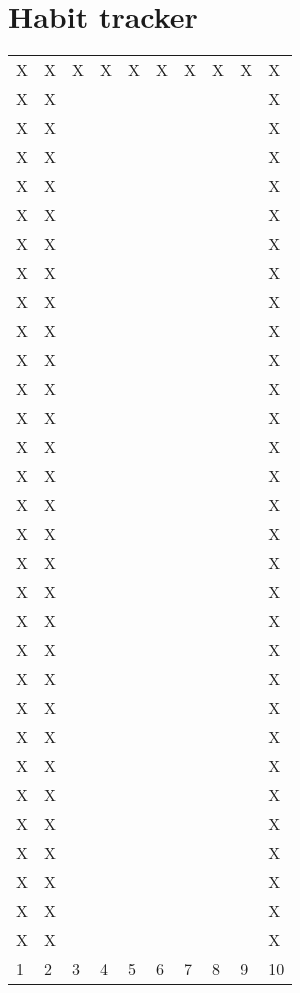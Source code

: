 \documentclass[a4paper]{article}
\begin{document}
\section{Habit tracker}
\begin{table}[htp]
\begin{tabular}{llllllllll}
X & X & X & X & X & X & X & X & X & X \\
X & X &   &   &   &   &   &   &   & X \\
X & X &   &   &   &   &   &   &   & X \\
X & X &   &   &   &   &   &   &   & X \\
X & X &   &   &   &   &   &   &   & X \\
X & X &   &   &   &   &   &   &   & X \\
X & X &   &   &   &   &   &   &   & X \\
X & X &   &   &   &   &   &   &   & X \\
X & X &   &   &   &   &   &   &   & X \\
X & X &   &   &   &   &   &   &   & X \\
X & X &   &   &   &   &   &   &   & X \\
X & X &   &   &   &   &   &   &   & X \\
X & X &   &   &   &   &   &   &   & X \\
X & X &   &   &   &   &   &   &   & X \\
X & X &   &   &   &   &   &   &   & X \\
X & X &   &   &   &   &   &   &   & X \\
X & X &   &   &   &   &   &   &   & X \\
X & X &   &   &   &   &   &   &   & X \\
X & X &   &   &   &   &   &   &   & X \\
X & X &   &   &   &   &   &   &   & X \\
X & X &   &   &   &   &   &   &   & X \\
X & X &   &   &   &   &   &   &   & X \\
X & X &   &   &   &   &   &   &   & X \\
X & X &   &   &   &   &   &   &   & X \\
X & X &   &   &   &   &   &   &   & X \\
X & X &   &   &   &   &   &   &   & X \\
X & X &   &   &   &   &   &   &   & X \\
X & X &   &   &   &   &   &   &   & X \\
X & X &   &   &   &   &   &   &   & X \\
X & X &   &   &   &   &   &   &   & X \\
X & X &   &   &   &   &   &   &   & X \\
1 & 2 & 3 & 4 & 5 & 6 & 7 & 8 & 9 & 10 \\
\end{tabular}
\end{table}
\end{document}
